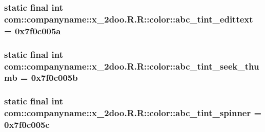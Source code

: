 \hypertarget{classcom_1_1companyname_1_1x__2doo_1_1_r_1_1color_49d2b1ff37ba6a58f377d3248086c01c}{
\subsubsection[{abc\_\-tint\_\-edittext}]{\setlength{\rightskip}{0pt plus 5cm}static final int com::companyname::x\_\-2doo.R.R::color::abc\_\-tint\_\-edittext = 0x7f0c005a}}
\label{classcom_1_1companyname_1_1x__2doo_1_1_r_1_1color_49d2b1ff37ba6a58f377d3248086c01c}


\hypertarget{classcom_1_1companyname_1_1x__2doo_1_1_r_1_1color_de7587ce166332934d9b6650a692dfe2}{
\subsubsection[{abc\_\-tint\_\-seek\_\-thumb}]{\setlength{\rightskip}{0pt plus 5cm}static final int com::companyname::x\_\-2doo.R.R::color::abc\_\-tint\_\-seek\_\-thumb = 0x7f0c005b}}
\label{classcom_1_1companyname_1_1x__2doo_1_1_r_1_1color_de7587ce166332934d9b6650a692dfe2}


\hypertarget{classcom_1_1companyname_1_1x__2doo_1_1_r_1_1color_19c3c519b01de6d955bf135910fbfa81}{
\subsubsection[{abc\_\-tint\_\-spinner}]{\setlength{\rightskip}{0pt plus 5cm}static final int com::companyname::x\_\-2doo.R.R::color::abc\_\-tint\_\-spinner = 0x7f0c005c}}
\label{classcom_1_1companyname_1_1x__2doo_1_1_r_1_1color_19c3c519b01de6d955bf135910fbfa81}


